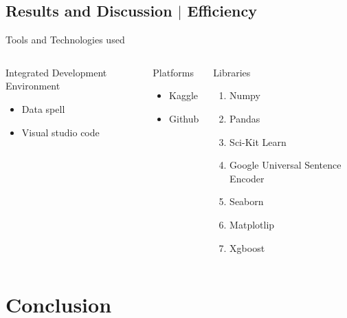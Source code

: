 \documentclass[11pt,aspectratio=169]{beamer}
\begin{document}
		
	\subsection{Results and Discussion $|$ Efficiency}
		\begin{frame}{Tools and Technologies used}
			\begin{columns}
				
					\begin{block}{Integrated Development Environment}
						\begin{itemize}
							\item Data spell
							\item Visual studio code
						\end{itemize}
					\end{block}
					\begin{block}{Platforms}
					
					\begin{itemize}
						\item Kaggle
						\item Github
						
					\end{itemize}
				\end{block}
				

					\begin{block}{Libraries}
						\begin{enumerate}[(1)]
							\item Numpy
							\item Pandas
							\item Sci-Kit Learn
							\item Google Universal Sentence Encoder
							\item Seaborn
							\item Matplotlip
							\item Xgboost
						\end{enumerate}
					\end{block}
				
				
				
			\end{columns}
		\end{frame}
	
	
	\section{Conclusion}
\end{document}
